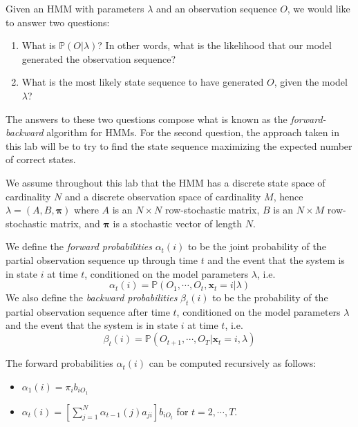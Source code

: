 
Given an HMM with parameters $\lambda$ and an observation sequence $O$, we would like to answer two questions:
\begin{enumerate}
 \item What is $\mathbb{P}(O | \lambda)$? In other words, what is the likelihood that our model generated the observation sequence?
 \item What is the most likely state sequence to have generated $O$, given the model $\lambda$?
\end{enumerate}
The answers to these two questions compose what is known as the \emph{forward-backward} algorithm for HMMs. For the second question, the approach taken in this lab will be to try to find the state sequence maximizing the expected number of correct states. 

We assume throughout this lab that the HMM has a discrete state space of cardinality $N$ and a discrete observation space of cardinality $M$, hence $\lambda = \left( A, B, \mathbf{\pi} \right)$ where $A$ is an $N \times N$ row-stochastic matrix, $B$ is an $N \times M$ row-stochastic matrix, and $\mathbf{\pi}$ is a stochastic vector of length $N$.

We define the \emph{forward probabilities} $\alpha_{t}(i)$ to be the joint probability of the partial observation sequence up through time $t$ and the event that the system is in state $i$ at time $t$, conditioned on the model parameters $\lambda$, i.e.
\begin{equation*}
\alpha_{t}(i) = \mathbb{P}(O_{1},\cdots,O_{t},\mathbf{x}_{t} = i | \lambda)
\end{equation*}
We also define the \emph{backward probabilities} $\beta_{t}(i)$ to be the probability of the partial observation sequence after time $t$, conditioned on the model parameters $\lambda$ and the event that the system is in state $i$ at time $t$, i.e.
\begin{equation*}
\beta_{t}(i) = \mathbb{P}(O_{t+1},\cdots,O_{T} | \mathbf{x}_{t} = i, \lambda)
\end{equation*}


The forward probabilities $\alpha_{t}(i)$ can be computed recursively as follows:
\begin{itemize}
 \item $\alpha_{1}(i) = \pi_{i}b_{iO_{1}}$
 \item $\alpha_{t}(i) = \left[ \sum_{j=1}^{N} \alpha_{t-1}(j)a_{ji}\right] b_{iO_{t}}$ for $t = 2,\cdots,T.$
\end{itemize}

